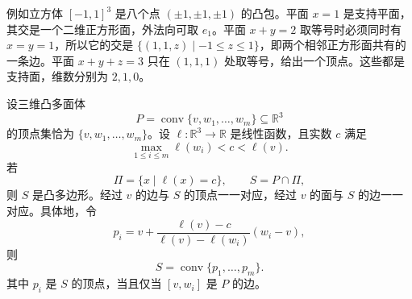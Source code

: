 \ProseParagraphBreak
例如立方体 \([-1,1]^3\) 是八个点 \((\pm1,\pm1,\pm1)\) 的凸包。平面 \(x=1\) 是支持平面，其交是一个二维正方形面，外法向可取 \(e_1\)。平面 \(x+y=2\) 取等号时必须同时有 \(x=y=1\)，所以它的交是 \(\{(1,1,z)\mid-1\leq z\leq1\}\)，即两个相邻正方形面共有的一条边。平面 \(x+y+z=3\) 只在 \((1,1,1)\) 处取等号，给出一个顶点。这些都是支持面，维数分别为 \(2,1,0\)。

\begin{lemma}[顶点截面]\label{b1:lem:vertex-section}
	设三维凸多面体
	\[
		P=\operatorname{conv}\{v,w_1,\ldots,w_m\}\subseteq\mathbb R^3
	\]
	的顶点集恰为 \(\{v,w_1,\ldots,w_m\}\)。设 \(\ell\colon\mathbb R^3\to\mathbb R\) 是线性函数，且实数 \(c\) 满足
	\[
		\max_{1\leq i\leq m}\ell(w_i)<c<\ell(v).
	\]
	若
	\[
		\Pi=\{x\mid\ell(x)=c\}, \qquad S=P\cap\Pi,
	\]
	则 \(S\) 是凸多边形。经过 \(v\) 的边与 \(S\) 的顶点一一对应，经过 \(v\) 的面与 \(S\) 的边一一对应。具体地，令
	\[
		p_i=v+\frac{\ell(v)-c}{\ell(v)-\ell(w_i)}(w_i-v),
	\]
	则
	\begin{equation}\label{b1:eq:vertex-section-hull}
		S=\operatorname{conv}\{p_1,\ldots,p_m\}.
	\end{equation}
	其中 \(p_i\) 是 \(S\) 的顶点，当且仅当 \([v,w_i]\) 是 \(P\) 的边。
\end{lemma}
